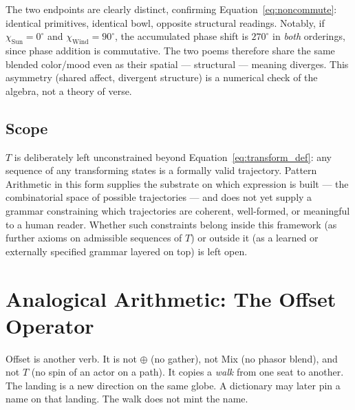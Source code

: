 \documentclass[12pt, a4paper]{article}
\begin{document}
The two endpoints are clearly distinct, confirming
Equation~\eqref{eq:noncommute}: identical primitives, identical
bowl, opposite structural readings. Notably, if $\chi_{\text{Sun}}
= 0^\circ$ and $\chi_{\text{Wind}} = 90^\circ$, the accumulated phase
shift is $270^\circ$ in \emph{both} orderings, since phase addition is
commutative. The two poems therefore share the same blended color/mood
even as their spatial --- structural --- meaning diverges. This
asymmetry (shared affect, divergent structure) is a numerical check of
the algebra, not a theory of verse.

\subsection{Scope}
\label{subsec:transform_scope}
$T$ is deliberately left unconstrained beyond
Equation~\eqref{eq:transform_def}: any sequence of any transforming
states is a formally valid trajectory. Pattern Arithmetic in this form
supplies the substrate on which expression is built --- the
combinatorial space of possible trajectories --- and does not yet
supply a grammar constraining which trajectories are coherent,
well-formed, or meaningful to a human reader. Whether such constraints
belong inside this framework (as further axioms on admissible
sequences of $T$) or outside it (as a learned or externally specified
grammar layered on top) is left open.

\section{Analogical Arithmetic: The Offset Operator}
\label{sec:analogical_offset}

Offset is another verb. It is not $\oplus$ (no gather), not Mix
(no phasor blend), and not $T$
(no spin of an actor on a path). It copies a \emph{walk} from one
seat to another. The landing is a new direction on the same globe.
A dictionary may later pin a name on that landing. The walk does
not mint the name.
\end{document}
